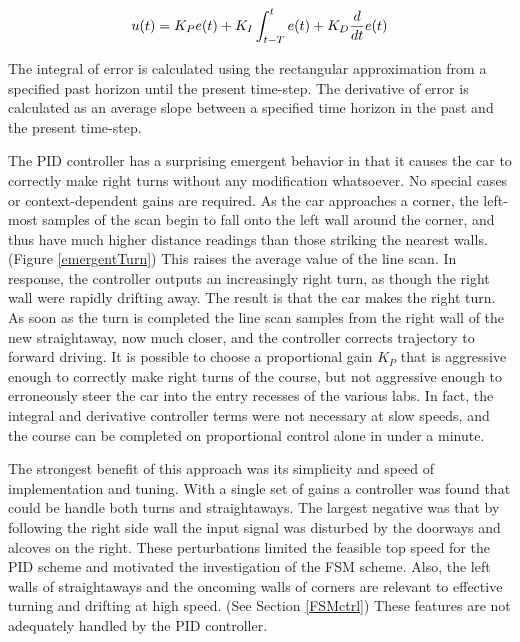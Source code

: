 \documentclass[letterpaper, 10 pt, conference]{ieeeconf}  %
\begin{document}
\begin{equation}
    u(t) = K_P e(t) + K_I \int_{t-T}^{t} e(t) + K_D { d \over dt } e(t)
\end{equation} \label{PIDeq}

The integral of error is calculated using the rectangular approximation from a specified past horizon until the present time-step.  The derivative of error is calculated as an average slope between a specified time horizon in the past and the present time-step. 

The PID controller has a surprising emergent behavior in that it causes the car to correctly make right turns without any modification whatsoever. No special cases or context-dependent gains are required.  As the car approaches a corner, the left-most samples of the scan begin to fall onto the left wall around the corner, and thus have much higher distance readings than those striking the nearest walls.  (Figure \ref{emergentTurn})   This raises the average value of the line scan.  In response, the controller outputs an increasingly right turn, as though the right wall were rapidly drifting away.  The result is that the car makes the right turn.  As soon as the turn is completed the line scan samples from the right wall of the new straightaway, now much closer, and the controller corrects trajectory to forward driving.  It is possible to choose a proportional gain $K_P$ that is aggressive enough to correctly make right turns of the course, but not aggressive enough to erroneously steer the car into the entry recesses of the various labs.  In fact, the integral and derivative controller terms were not necessary at slow speeds, and the course can be completed on proportional control alone in under a minute.

The strongest benefit of this approach was its simplicity and speed of implementation and tuning. With a single set of gains a controller was found that could be handle both turns and straightaways. The largest negative was that by following the right side wall the input signal was disturbed by the doorways and alcoves on the right.  These perturbations limited the feasible top speed for the PID scheme and motivated the investigation of the FSM scheme.  Also, the left walls of straightaways and the oncoming walls of corners are relevant to effective turning and drifting at high speed.  (See Section \ref{FSMctrl})  These features are not adequately handled by the PID controller.


\end{document}
